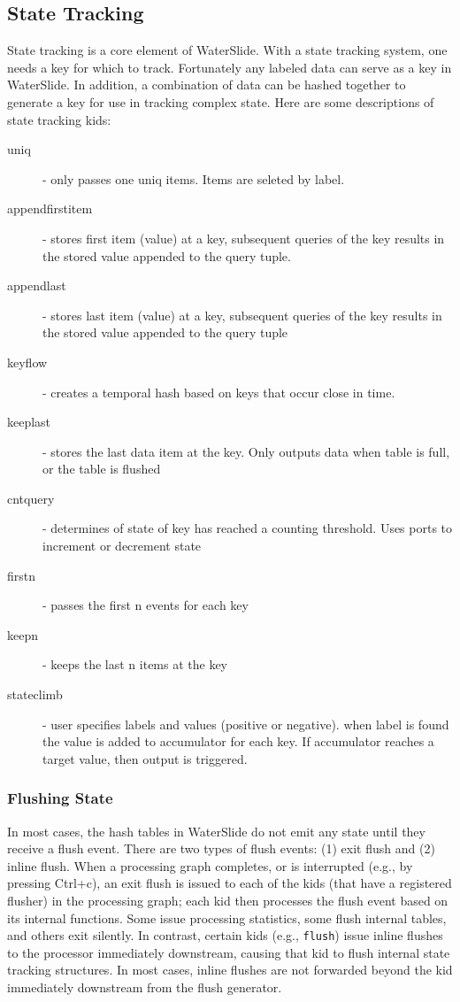 \documentclass[11pt]{article}
\begin{document}
\subsection {State Tracking}
State tracking is a core element of WaterSlide.  With a state tracking system, one needs a key for
which to track.  Fortunately any labeled data can serve as a key in WaterSlide.  In addition, a
combination of data can be hashed together to generate a key for use in tracking complex state.
Here are some descriptions of state tracking kids: 
\begin{description}
\item [uniq] - only passes one uniq items.  Items are seleted by label.
\item [appendfirstitem] - stores first item (value) at a key, subsequent queries of the key results
in the stored value appended to the query tuple.
\item [appendlast] - stores last item (value) at a key, subsequent queries of the key results
in the stored value appended to the query tuple
\item [keyflow] - creates a temporal hash based on keys that occur close in time.
\item [keeplast] - stores the last data item at the key. Only outputs data when table is full, or the
table is flushed
\item [cntquery] - determines of state of key has reached a counting threshold.  Uses ports to
increment or decrement state
\item [firstn] - passes the first n events for each key
\item [keepn] - keeps the last n items at the key
\item [stateclimb] - user specifies labels and values (positive or negative). when label is found
the value is added to accumulator for each key.  If accumulator reaches a target value, then output
is triggered.
\end{description}

\subsubsection{Flushing State}
In most cases, the hash tables in WaterSlide do not emit any state until they receive a flush event.
There are two types of flush events: (1) exit flush and (2) inline flush. When a processing graph
completes, or is interrupted (e.g., by pressing Ctrl+c), an exit flush is issued to each of the kids
(that have a registered flusher) 
in the processing graph; each kid then processes the flush event based on its internal functions. Some
issue processing statistics, some flush internal tables, and others exit silently. In contrast,
certain kids
(e.g., \texttt{flush}) issue inline flushes to the processor immediately downstream, causing that
kid to flush internal state tracking structures. In most cases, inline flushes are not forwarded
beyond the kid immediately downstream from the flush generator.
\end{document}
